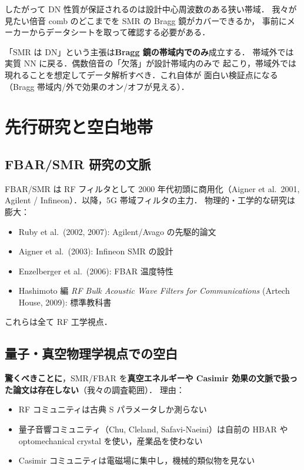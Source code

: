 \documentclass[11pt,a4paper]{article}
\begin{document}
したがって DN 性質が保証されるのは設計中心周波数のある狭い帯域．
我々が見たい倍音 comb のどこまでを SMR の Bragg 鏡がカバーできるか，
事前にメーカーからデータシートを取って確認する必要がある．

\begin{tcolorbox}[colback=red!5,colframe=red!50!black,title=落とし穴]
「SMR は DN」という主張は\textbf{Bragg 鏡の帯域内でのみ}成立する．
帯域外では実質 NN に戻る．偶数倍音の「欠落」が設計帯域内のみで
起こり，帯域外では現れることを想定してデータ解析すべき．これ自体が
面白い検証点になる（Bragg 帯域内/外で効果のオン/オフが見える）．
\end{tcolorbox}

\section{先行研究と空白地帯}

\subsection{FBAR/SMR 研究の文脈}

FBAR/SMR は RF フィルタとして 2000 年代初頭に商用化（Aigner et al.\
2001, Agilent / Infineon）．以降，5G 帯域フィルタの主力．
物理的・工学的な研究は膨大：

\begin{itemize}
\item Ruby et al.\ (2002, 2007): Agilent/Avago の先駆的論文
\item Aigner et al.\ (2003): Infineon SMR の設計
\item Enzelberger et al.\ (2006): FBAR 温度特性
\item Hashimoto 編 \textit{RF Bulk Acoustic Wave Filters for Communications}
(Artech House, 2009): 標準教科書
\end{itemize}

これらは全て RF 工学視点．

\subsection{量子・真空物理学視点での空白}

\textbf{驚くべきことに}，SMR/FBAR を\textbf{真空エネルギーや
Casimir 効果の文脈で扱った論文は存在しない}（我々の調査範囲）．
理由：
\begin{itemize}
\item RF コミュニティは古典 S パラメータしか測らない
\item 量子音響コミュニティ（Chu, Cleland, Safavi-Naeini）は自前の
HBAR や optomechanical crystal を使い，産業品を使わない
\item Casimir コミュニティは電磁場に集中し，機械的類似物を見ない
\end{itemize}
\end{document}
